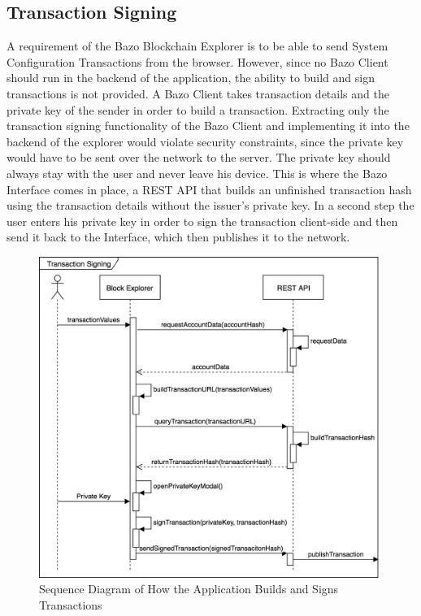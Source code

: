 \subsection{Transaction Signing} \label{txsigning}
A requirement of the Bazo Blockchain Explorer is to be able to send System Configuration Transactions from the browser. 
However, since no Bazo Client should run in the backend of the application, the ability to build and sign transactions is not provided. A Bazo Client takes transaction details and the private key of the sender in order to build a transaction. Extracting only the transaction signing functionality of the Bazo Client and implementing it into the backend of the explorer would violate security constraints, since the private key would have to be sent over the network to the server. The private key should always stay with the user and never leave his device. This is where the Bazo Interface \cite{marc} comes in place, a REST API that builds an unfinished transaction hash using the transaction details without the issuer's private key. In a second step the user enters his private key in order to sign the transaction client-side and then send it back to the Interface, which then publishes it to the network.

\begin{figure}
  \includegraphics[scale=0.35]{transactionbuilding.png}
  \centering
  \caption{Sequence Diagram of How the Application Builds and Signs Transactions}
  \label{fig:sequence1}
\end{figure}

